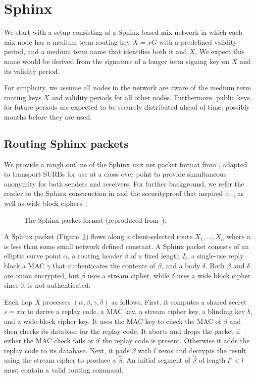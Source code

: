 
\section{Sphinx}

We start with a setup consisting of a Sphinx-based mix network in
which each mix node has a medium term routing key $X = x G$ with a
predefined validity period, and a medium term name that identifies
both it and $X$.  We expect this name would be derived from the
signature of a longer term signing key on $X$ and its validity period.

For simplicity, we assume all nodes in the network are aware of the
medium term routing keys $X$ and validity periods for all other nodes.
Furthermore, public keys for future periods are expected to be
securely distributed ahead of time, possibly months before they are
used.


\subsection{Routing Sphinx packets}

We provide a rough outline of the Sphinx mix net packet format from 
\cite{Sphinx}, adapted to transport SURBs for use at a cross over point
to provide simultaneous anonymity for both senders and receivers.
For further background, we refer the reader to the Sphinx construction
in \cite{Sphinx} and the securityproof that inspired it~\cite{FormalOnion},
as well as wide block ciphers~\cite{Lionness}.

\begin{figure}
  \begin{center}
  
  \end{center}
  \caption{The Sphinx packet format (reproduced from~\cite{Sphinx}).}
  \label{fig:sphinx}
\end{figure}

A Sphinx packet (Figure~\ref{fig:sphinx}) flows along a client-selected
route $X_1,\ldots,X_n$ where $n$ is less than some small network defined
constant.  A Sphinx packet consists of an elliptic curve point $\alpha$,
a routing header $\beta$ of a fixed length $L$, a single-use reply block
a MAC $\gamma$ that authenticates the contents of $\beta$, and a body
$\delta$.  Both $\beta$ and $\delta$ are onion encrypted, but $\beta$
uses a stream cipher, while $\delta$ uses a wide block cipher since
it is not authenticated.

Each hop $X$ processes $(\alpha,\beta,\gamma,\delta)$ as follows.  
First, it computes a shared secret $s = x \alpha$ to
derive a replay code, a MAC key, a stream cipher key, 
 a blinding key $b$, and a wide block cipher key. 
It uses the MAC key to check the MAC of $\beta$ and
 then checks its database for the replay code.
It aborts and drops the packet if either the MAC check fails or
 if the replay code is present.  Otherwise it adds the replay code
 to its database.
Next, it pads $\beta$ with $l$ zeros and decrypts the result
 using the stream cipher to produce a $\hat\beta$.
An initial segment of $\hat\beta$ of length $l' < l$ must contain
a valid routing command.  

